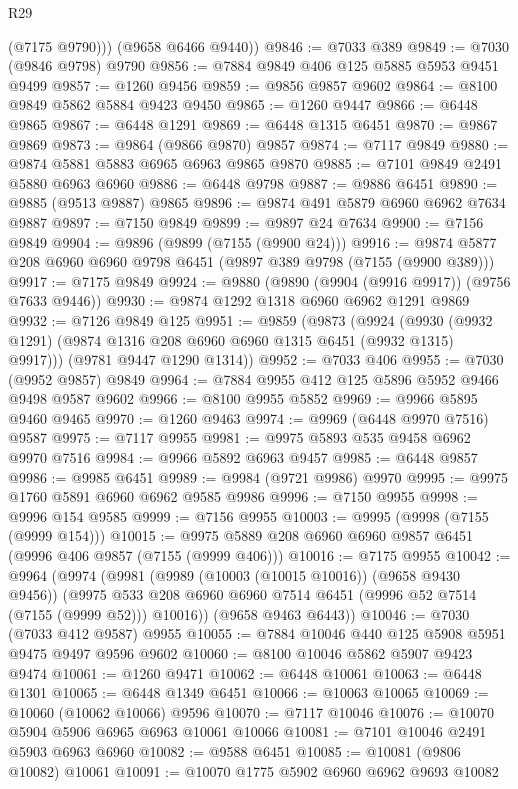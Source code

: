 \begin{lexlean}{R29}
\begin{coremodule}
          (@7175 @9790)))
      (@9658 @6466 @9440))
@9846 := @7033 @389
@9849 := @7030 (@9846 @9798) @9790
@9856 := @7884 @9849 @406 @125 @5885 @5953 @9451 @9499
@9857 := @1260 @9456
@9859 := @9856 @9857 @9602
@9864 := @8100 @9849 @5862 @5884 @9423 @9450
@9865 := @1260 @9447
@9866 := @6448 @9865
@9867 := @6448 @1291
@9869 := @6448 @1315 @6451
@9870 := @9867 @9869
@9873 := @9864 (@9866 @9870) @9857
@9874 := @7117 @9849
@9880 := @9874 @5881 @5883 @6965 @6963 @9865 @9870
@9885 := @7101 @9849 @2491 @5880 @6963 @6960
@9886 := @6448 @9798
@9887 := @9886 @6451
@9890 := @9885 (@9513 @9887) @9865
@9896 := @9874 @491 @5879 @6960 @6962 @7634 @9887
@9897 := @7150 @9849
@9899 := @9897 @24 @7634
@9900 := @7156 @9849
@9904 := @9896 (@9899 (@7155 (@9900 @24)))
@9916 := @9874 @5877 @208 @6960 @6960 @9798 @6451 (@9897 @389 @9798 (@7155 (@9900 @389)))
@9917 := @7175 @9849
@9924 := @9880 (@9890 (@9904 (@9916 @9917)) (@9756 @7633 @9446))
@9930 := @9874 @1292 @1318 @6960 @6962 @1291 @9869
@9932 := @7126 @9849 @125
@9951 := @9859
    (@9873
      (@9924 (@9930 (@9932 @1291) (@9874 @1316 @208 @6960 @6960 @1315 @6451 (@9932 @1315) @9917)))
      (@9781 @9447 @1290 @1314))
@9952 := @7033 @406
@9955 := @7030 (@9952 @9857) @9849
@9964 := @7884 @9955 @412 @125 @5896 @5952 @9466 @9498 @9587 @9602
@9966 := @8100 @9955 @5852
@9969 := @9966 @5895 @9460 @9465
@9970 := @1260 @9463
@9974 := @9969 (@6448 @9970 @7516) @9587
@9975 := @7117 @9955
@9981 := @9975 @5893 @535 @9458 @6962 @9970 @7516
@9984 := @9966 @5892 @6963 @9457
@9985 := @6448 @9857
@9986 := @9985 @6451
@9989 := @9984 (@9721 @9986) @9970
@9995 := @9975 @1760 @5891 @6960 @6962 @9585 @9986
@9996 := @7150 @9955
@9998 := @9996 @154 @9585
@9999 := @7156 @9955
@10003 := @9995 (@9998 (@7155 (@9999 @154)))
@10015 := @9975 @5889 @208 @6960 @6960 @9857 @6451 (@9996 @406 @9857 (@7155 (@9999 @406)))
@10016 := @7175 @9955
@10042 := @9964
    (@9974
      (@9981
        (@9989 (@10003 (@10015 @10016)) (@9658 @9430 @9456))
        (@9975 @533 @208 @6960 @6960 @7514 @6451 (@9996 @52 @7514 (@7155 (@9999 @52))) @10016))
      (@9658 @9463 @6443))
@10046 := @7030 (@7033 @412 @9587) @9955
@10055 := @7884 @10046 @440 @125 @5908 @5951 @9475 @9497 @9596 @9602
@10060 := @8100 @10046 @5862 @5907 @9423 @9474
@10061 := @1260 @9471
@10062 := @6448 @10061
@10063 := @6448 @1301
@10065 := @6448 @1349 @6451
@10066 := @10063 @10065
@10069 := @10060 (@10062 @10066) @9596
@10070 := @7117 @10046
@10076 := @10070 @5904 @5906 @6965 @6963 @10061 @10066
@10081 := @7101 @10046 @2491 @5903 @6963 @6960
@10082 := @9588 @6451
@10085 := @10081 (@9806 @10082) @10061
@10091 := @10070 @1775 @5902 @6960 @6962 @9693 @10082

\end{coremodule}
\end{lexlean}
